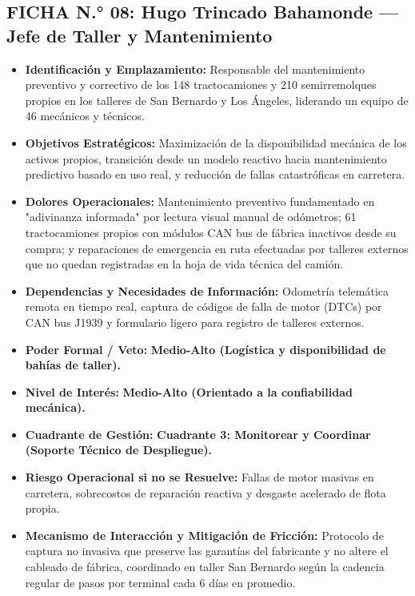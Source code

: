 \subsection*{FICHA N.° 08: Hugo Trincado Bahamonde — Jefe de Taller y Mantenimiento}
\begin{itemize}
\item \textbf{Identificación y Emplazamiento:} Responsable del mantenimiento preventivo y correctivo de los 148 tractocamiones y 210 semirremolques propios en los talleres de San Bernardo y Los Ángeles, liderando un equipo de 46 mecánicos y técnicos.
\item \textbf{Objetivos Estratégicos:} Maximización de la disponibilidad mecánica de los activos propios, transición desde un modelo reactivo hacia mantenimiento predictivo basado en uso real, y reducción de fallas catastróficas en carretera.
\item \textbf{Dolores Operacionales:} Mantenimiento preventivo fundamentado en "adivinanza informada" por lectura visual manual de odómetros; 61 tractocamiones propios con módulos CAN bus de fábrica inactivos desde su compra; y reparaciones de emergencia en ruta efectuadas por talleres externos que no quedan registradas en la hoja de vida técnica del camión.
\item \textbf{Dependencias y Necesidades de Información:} Odometría telemática remota en tiempo real, captura de códigos de falla de motor (DTCs) por CAN bus J1939 y formulario ligero para registro de talleres externos.
\item \textbf{Poder Formal / Veto:} \textbf{Medio-Alto (Logística y disponibilidad de bahías de taller).}
\item \textbf{Nivel de Interés:} \textbf{Medio-Alto (Orientado a la confiabilidad mecánica).}
\item \textbf{Cuadrante de Gestión:} \textbf{Cuadrante 3: Monitorear y Coordinar (Soporte Técnico de Despliegue).}
\item \textbf{Riesgo Operacional si no se Resuelve:} Fallas de motor masivas en carretera, sobrecostos de reparación reactiva y desgaste acelerado de flota propia.
\item \textbf{Mecanismo de Interacción y Mitigación de Fricción:} Protocolo de captura no invasiva que preserve las garantías del fabricante y no altere el cableado de fábrica, coordinado en taller San Bernardo según la cadencia regular de pasos por terminal cada 6 días en promedio.
\end{itemize}
